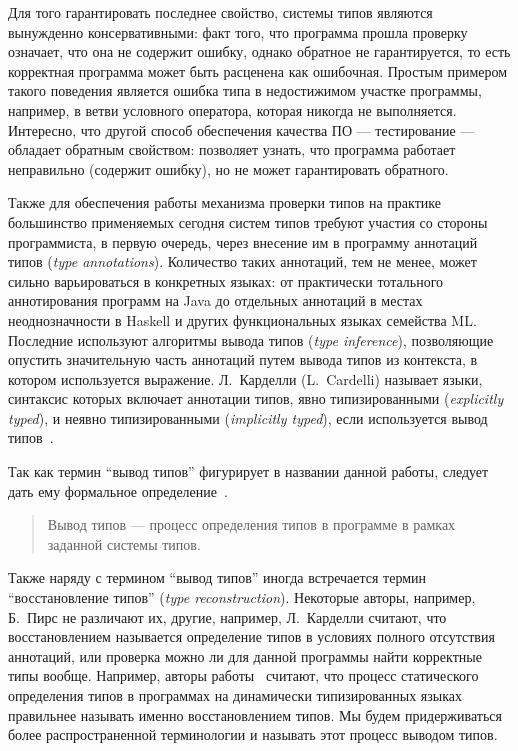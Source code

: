 Для того гарантировать последнее свойство, системы типов являются 
вынужденно консервативными: факт того, что программа прошла проверку означает, что
она не содержит ошибку, однако обратное не гарантируется, то есть
корректная программа может быть расценена как ошибочная. Простым примером
такого поведения является ошибка типа в недостижимом участке программы,
например, в ветви условного оператора, которая никогда не выполняется. 
Интересно, что другой способ обеспечения качества ПО --- тестирование ---
обладает обратным свойством: позволяет узнать, что программа работает
неправильно (содержит ошибку), но не может гарантировать обратного.

Также для обеспечения работы механизма проверки типов на практике большинство
применяемых сегодня систем типов требуют участия со стороны программиста, в
первую очередь, через внесение им в программу аннотаций типов (\emph{type
  annotations}). Количество таких аннотаций, тем не менее, может сильно
варьироваться в конкретных языках: от практически тотального аннотирования
программ на Java до отдельных аннотаций в местах неоднозначности в Haskell и
других функциональных языках семейства ML. Последние используют алгоритмы вывода
типов (\emph{type inference}), позволяющие опустить значительную часть аннотаций
путем вывода типов из контекста, в котором используется выражение.  
Л.~Карделли (L.~Cardelli) называет языки, синтаксис которых включает аннотации
типов, явно типизированными (\emph{explicitly typed}), и неявно типизированными
(\emph{implicitly typed}), если используется вывод типов~\cite{Cardelli2004}.

Так как термин ``вывод типов'' фигурирует в названии данной работы, следует
дать ему формальное определение~\cite{Cardelli2004}.

\begin{quote}
  
  Вывод типов --- процесс определения типов в программе в рамках заданной системы
  типов. 
\end{quote}


Также наряду с термином ``вывод типов'' иногда встречается термин
``восстановление типов'' (\emph{type reconstruction}). Некоторые авторы, например,
Б.~Пирс не различают их, другие, например, Л.~Карделли считают, что
восстановлением называется определение типов в условиях полного отсутствия
аннотаций, или проверка можно ли для данной программы найти корректные типы
вообще. 
Например, авторы работы~\cite{Pluquet2009} считают, что процесс
статического определения типов в программах на динамически типизированных языках
правильнее называть именно восстановлением типов. Мы будем
придерживаться более распространенной терминологии и называть этот процесс
выводом типов.

